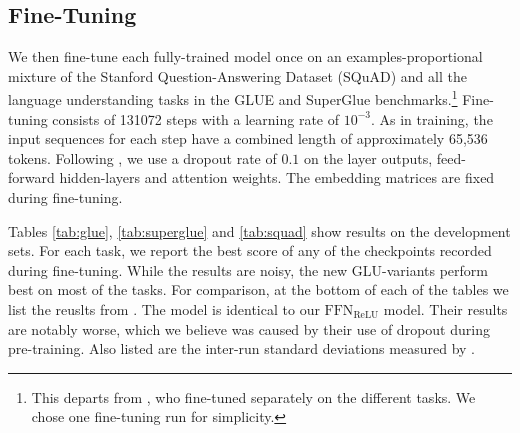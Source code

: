 \documentclass{article}
\begin{document}
\subsection{Fine-Tuning}
We then fine-tune each fully-trained model once on an examples-proportional mixture of the Stanford Question-Answering Dataset (SQuAD) \citep{rajpurkar2016squad} and all the language understanding tasks in the GLUE \citep{wang2018glue} and SuperGlue \citep{wang2019superglue} benchmarks.\footnote{This departs from \citep{raffel2019exploring}, who fine-tuned separately on the different tasks.  We chose one fine-tuning run for simplicity.}  Fine-tuning consists of 131072 steps with a learning rate of $10^{-3}$.  As in training, the input sequences for each step have a combined length of approximately 65,536 tokens.  Following \citep{raffel2019exploring}, we use a dropout rate of $0.1$ on the layer outputs, feed-forward hidden-layers and attention weights.  The embedding matrices are fixed during fine-tuning.

Tables \ref{tab:glue}, \ref{tab:superglue} and \ref{tab:squad} show results on the development sets.  For each task, we report the best score of any of the checkpoints recorded during fine-tuning.  While the results are noisy, the new GLU-variants perform best on most of the tasks.  For comparison, at the bottom of each of the tables we list the reuslts from \citep{raffel2019exploring}.  The model is identical to our $\textrm{FFN}_\textrm{ReLU}$ model.  Their results are notably worse, which we believe was caused by their use of dropout during pre-training.  Also listed are the inter-run standard deviations measured by \citep{raffel2019exploring}.
\end{document}
